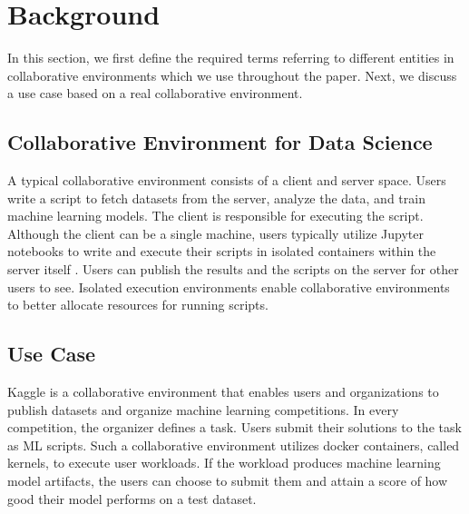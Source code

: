\section{Background} \label{sec-background}
In this section, we first define the required terms referring to different entities in collaborative environments which we use throughout the paper.
Next, we discuss a use case based on a real collaborative environment.

\subsection{Collaborative Environment for Data Science}
A typical collaborative environment consists of a client and server space.
Users write a script to fetch datasets from the server, analyze the data, and train machine learning models.
The client is responsible for executing the script.
Although the client can be a single machine, users typically utilize Jupyter notebooks  \cite{Kluyver:2016aa} to write and execute their scripts in isolated containers \cite{merkel2014docker} within the server itself \cite{kagglewebsite, googlecolab, netflix-notebook}.
Users can publish the results and the scripts on the server for other users to see.
Isolated execution environments enable collaborative environments to better allocate resources for running scripts.

\subsection{Use Case}\label{subsec-motivational-example}
Kaggle is a collaborative environment that enables users and organizations to publish datasets and organize machine learning competitions.
In every competition, the organizer defines a task.
Users submit their solutions to the task as ML scripts.
Such a collaborative environment utilizes docker containers, called kernels, to execute user workloads.
If the workload produces machine learning model artifacts, the users can choose to submit them and attain a score of how good their model performs on a test dataset.

